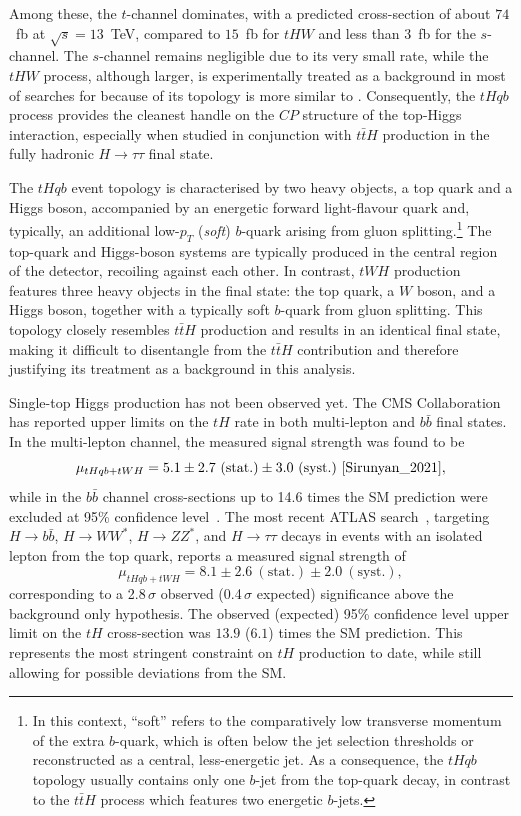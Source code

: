 Among these, the $t$-channel dominates, with a predicted cross-section of about $74$~fb at $\sqrt{s}=13$~TeV, compared to $15$~fb for $tHW$ and less than $3$~fb for the $s$-channel. The $s$-channel remains negligible due to its very small rate, while the $tHW$ process, although larger, is experimentally treated as a background in most of searches for \thqb because of its topology is more similar to \ttH. Consequently, the $tHqb$ process provides the cleanest handle on the $CP$ structure of the top-Higgs interaction, especially when studied in conjunction with $t\bar{t}H$ production in the fully hadronic $H \to \tau \tau$ final state.

The $tHqb$ event topology is characterised by two heavy objects, a top quark and a Higgs boson, accompanied by an energetic forward light-flavour quark and, typically, an additional low-$p_{T}$ (\textit{soft}) $b$-quark arising from gluon splitting.\footnote{In this context, ``soft'' refers to the comparatively low transverse momentum of the extra $b$-quark, which is often below the jet selection thresholds or reconstructed as a central, less-energetic jet. As a consequence, the $tHqb$ topology usually contains only one $b$-jet from the top-quark decay, in contrast to the $t\bar{t}H$ process which features two energetic $b$-jets.}
  The top-quark and Higgs-boson systems are typically produced in the central region of the detector, recoiling against each other. 
  In contrast, $tWH$ production features three heavy objects in the final state: the top quark, a $W$ boson, and a Higgs boson, together with a typically soft $b$-quark from gluon splitting. 
  This topology closely resembles $t\bar{t}H$ production and results in an identical final state, making it difficult to disentangle from the $t\bar{t}H$ contribution and therefore justifying its treatment as a background in this analysis. 
  
  Single-top Higgs production has not been observed yet.
  The CMS Collaboration has reported upper limits on the $tH$ rate in both multi-lepton and $b\bar{b}$ final states. 
  In the multi-lepton channel, the measured signal strength was found to be 
  \[
  \mu_{tHqb+tWH} = 5.1 \pm 2.7~(\text{stat.}) \pm 3.0~(\text{syst.})~\cite{Sirunyan_2021},
  \] 
  while in the $b\bar{b}$ channel cross-sections up to 14.6 times the SM prediction were excluded at 95\% confidence level~\cite{2025}. 
  The most recent ATLAS search~\cite{ATLAS:2025irr}, targeting $H\to b\bar{b}$, $H\to WW^*$, $H\to ZZ^*$, and $H\to\tau\tau$ decays in events with an isolated lepton from the top quark, reports a measured signal strength of
  \[
  \mu_{tHqb+tWH} = 8.1 \pm 2.6~(\text{stat.}) \pm 2.0~(\text{syst.}),
  \] 
  corresponding to a 2.8\,$\sigma$ observed (0.4\,$\sigma$ expected) significance above the background only hypothesis. 
  The observed (expected) 95\% confidence level upper limit on the $tH$ cross-section was $13.9$ ($6.1$) times the SM prediction. 
  This represents the most stringent constraint on $tH$ production to date, while still allowing for possible deviations from the SM.  
  
